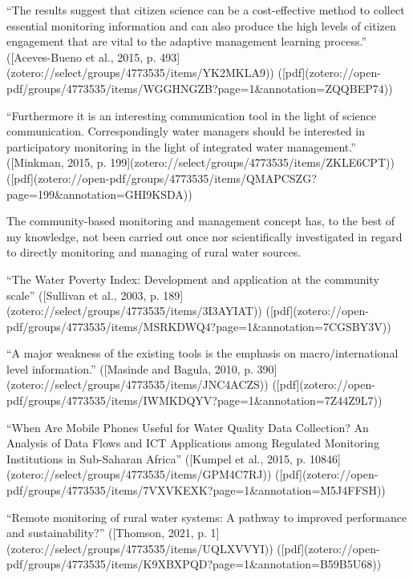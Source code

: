{%
“The results suggest that citizen science can be a cost-effective method to collect essential monitoring information and can also produce the high levels of citizen engagement that are vital to the adaptive management learning process.” ([Aceves-Bueno et al., 2015, p. 493](zotero://select/groups/4773535/items/YK2MKLA9)) ([pdf](zotero://open-pdf/groups/4773535/items/WGGHNGZB?page=1&annotation=ZQQBEP74))

“Furthermore it is an interesting communication tool in the light of science communication. Correspondingly water managers should be interested in participatory monitoring in the light of integrated water management.” ([Minkman, 2015, p. 199](zotero://select/groups/4773535/items/ZKLE6CPT)) ([pdf](zotero://open-pdf/groups/4773535/items/QMAPCSZG?page=199&annotation=GHI9KSDA))


The community-based monitoring and management concept has, to the best of my knowledge, not been carried out once nor scientifically investigated in regard to directly monitoring and managing of rural water sources.

“The Water Poverty Index: Development and application at the community scale” ([Sullivan et al., 2003, p. 189](zotero://select/groups/4773535/items/3I3AYIAT)) ([pdf](zotero://open-pdf/groups/4773535/items/MSRKDWQ4?page=1&annotation=7CGSBY3V))

“A major weakness of the existing tools is the emphasis on macro/international level information.” ([Masinde and Bagula, 2010, p. 390](zotero://select/groups/4773535/items/JNC4ACZS)) ([pdf](zotero://open-pdf/groups/4773535/items/IWMKDQYV?page=1&annotation=7Z44Z9L7))

“When Are Mobile Phones Useful for Water Quality Data Collection? An Analysis of Data Flows and ICT Applications among Regulated Monitoring Institutions in Sub-Saharan Africa” ([Kumpel et al., 2015, p. 10846](zotero://select/groups/4773535/items/GPM4C7RJ)) ([pdf](zotero://open-pdf/groups/4773535/items/7VXVKEXK?page=1&annotation=M5J4FFSH))

“Remote monitoring of rural water systems: A pathway to improved performance and sustainability?” ([Thomson, 2021, p. 1](zotero://select/groups/4773535/items/UQLXVVYI)) ([pdf](zotero://open-pdf/groups/4773535/items/K9XBXPQD?page=1&annotation=B59B5U68))

}
